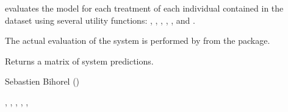 %
\begin{Details}\relax
{} evaluates the model for each treatment of each individual 
contained in the dataset using several utility functions: ,
, , , ,
and .

The actual evaluation of the system is performed by  from the 
 package.
\end{Details}
%
\begin{Value}
Returns a matrix of system predictions.
\end{Value}
%
\begin{Author}\relax
Sebastien Bihorel ()
\end{Author}
%
\begin{SeeAlso}\relax
{},
, ,
, ,
\end{SeeAlso}
